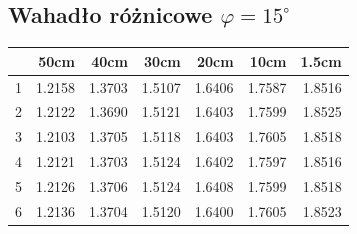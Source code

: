 \documentclass[a4paper,10pt]{article}
\begin{document}
\subsection{Wahadło różnicowe $\varphi = 15^\circ$}
\begin{tabular}{lrrrrrr}
\toprule
{} &      50cm &      40cm &      30cm &      20cm &      10cm &     1.5cm \\
\midrule
1 &  1.2158 &  1.3703 &  1.5107 &  1.6406 &  1.7587 &  1.8516 \\
2 &  1.2122 &  1.3690 &  1.5121 &  1.6403 &  1.7599 &  1.8525 \\
3 &  1.2103 &  1.3705 &  1.5118 &  1.6403 &  1.7605 &  1.8518 \\
4 &  1.2121 &  1.3703 &  1.5124 &  1.6402 &  1.7597 &  1.8516 \\
5 &  1.2126 &  1.3706 &  1.5124 &  1.6408 &  1.7599 &  1.8518 \\
6 &  1.2136 &  1.3704 &  1.5120 &  1.6400 &  1.7605 &  1.8523 \\
\bottomrule
\end{tabular}
\end{document}
